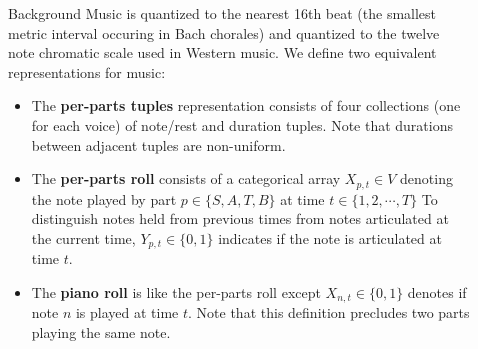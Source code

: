 \documentclass[final]{beamer}
\newlength{\sepwid}
\newlength{\onecolwid}
\newlength{\twocolwid}
\begin{document}
\begin{frame}[t]
\begin{columns}[t]
\begin{column}{\onecolwid}

\begin{block}{Background}
  Music is quantized to the nearest 16th beat (the smallest metric interval
  occuring in Bach chorales) and quantized to the twelve note chromatic scale
  used in Western music. We define two equivalent representations for music:
  \begin{itemize}
    \item The \textbf{per-parts tuples} representation consists of four collections (one for
      each voice) of note/rest and duration tuples. Note that durations between adjacent
      tuples are non-uniform.
    \item The \textbf{per-parts roll} consists of a categorical array $X_{p,t} \in V$
      denoting the note played by part $p \in \{S,A,T,B\}$ at time $t \in \{1,2,\cdots,T\}$
      To distinguish notes held from previous times from notes articulated at the current
      time, $Y_{p,t} \in \{0,1\}$ indicates if the note is articulated at time $t$.
    \item The \textbf{piano roll} is like the per-parts roll except $X_{n,t} \in \{0,1\}$
      denotes if note $n$ is played at time $t$. Note that this definition precludes
      two parts playing the same note.
  \end{itemize}

\end{block}


\end{column} %

\begin{column}{\sepwid}\end{column} %

\begin{column}{\twocolwid} %

\begin{columns}[t,totalwidth=\twocolwid] %

\begin{column}{\onecolwid}\vspace{-.6in} %


\end{column}
\end{columns}
\end{column}
\end{columns}
\end{frame}
\end{document}
